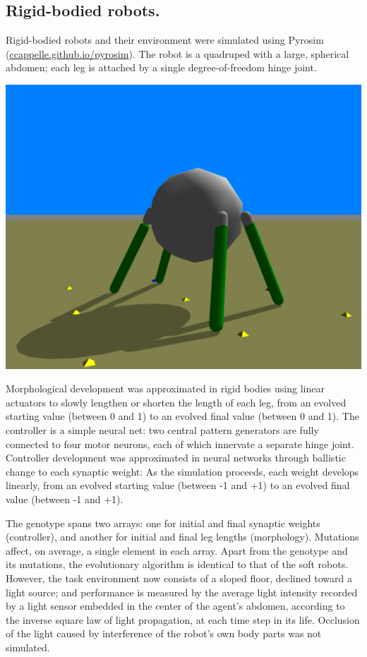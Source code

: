 \subsection{Rigid-bodied robots.}

Rigid-bodied robots and their environment were simulated using Pyrosim
(\href{https://ccappelle.github.io/pyrosim/}{ccappelle.github.io/pyrosim}).
The robot is a quadruped with a large, spherical abdomen; each leg is attached by a single degree-of-freedom hinge joint.\\[0.75em]
\centerline{\includegraphics[width=0.4\linewidth]{Chapter04/rigid-body.png}}

\vspace{0.75em}
Morphological development was approximated in rigid bodies using linear actuators to slowly lengthen or shorten the length of each leg, from an evolved starting value (between 0 and 1) to an evolved final value (between 0 and 1).
The controller is a simple neural net: two central pattern generators are fully connected to four motor neurons, each of which innervate a separate hinge joint.
Controller development was approximated in neural networks through ballistic change to each synaptic weight: As the simulation proceeds, each weight develops linearly, from an evolved starting value (between -1 and +1) to an evolved final value (between -1 and +1).


The genotype spans two arrays: one for initial and final synaptic weights (controller), and another for initial and final leg lengths (morphology). 
Mutations affect, on average, a single element in each array.
Apart from the genotype and its mutations, the evolutionary algorithm is identical to that of the soft robots.
However, the task environment now consists of a sloped floor, declined toward a light source; and
performance is measured by the average light intensity recorded by a light sensor embedded in the center of the agent's abdomen, according to the inverse square law of light propagation, at each time step in its life. Occlusion of the light caused by interference of the robot's own body parts was not simulated.


